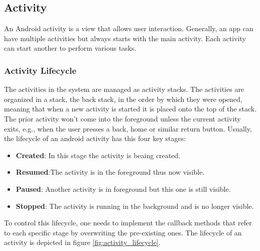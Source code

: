 \subsection{Activity}
\label{sec:activity}
An Android activity  is a view that allows user interaction. Generally, an app can have multiple activities but always starts with the main activity.
Each activity can start another to perform various tasks.

\subsubsection{Activity Lifecycle}
\label{sec:activity_lifecycle}
The activities in the system are managed as activity stacks. The activities are organized in a stack, the back stack, in the order by which they were opened, meaning that when a new activity is started it is placed onto the top of the stack. The prior activity won't come into the foreground unless the current activity exits, e.g., when the user presses a back, home or similar return button.
%
Usually, the lifecycle of an android activity has this four key stages:
\begin {itemize}
\item \textbf {Created}: In this stage the activity is beaing created.
\item \textbf {Resumed}:The activity is in the foreground thus now visible.
\item \textbf {Paused}: Another activity is in foreground but this one is still visible.
\item \textbf {Stopped}: The activity is running in the background and is no longer visible.
\end {itemize}
%
To control this lifecycle, one needs to implement the callback methods that refer to each specific stage by overwriting the pre-existing ones. The lifecycle of an activity is depicted in figure \ref{fig:activity_lifecycle}.
%
